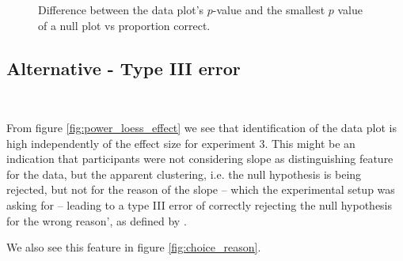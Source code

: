 \documentclass{article}
\newcommand{\blue}[1]{{\color{blue} #1}} %
\newcommand{\green}[1]{{\color{green} #1}} %
\newcommand{\hh}[1]{{\color{orange} #1}} %
\begin{document}
\begin{figure}[hbtp]
   \centering
       \caption{Difference between the data plot's $p$-value and the  smallest $p$ value of a null plot vs proportion correct.}
       \label{fig:pval_difference}
\end{figure}

\subsection{Alternative - Type III error}~\label{sec:TypeIII}

\hh{From figure \ref{fig:power_loess_effect} we see that identification of the data plot is high independently of the effect size for experiment 3. This might be an indication that participants were not considering slope as distinguishing feature for the data, but the apparent clustering, i.e. the null hypothesis is being rejected, but not for the reason of the slope -- which the experimental setup was asking for --  leading to a type III error of correctly rejecting the null hypothesis for the wrong reason', as defined by \citet{mosteller:48}.} 


\blue{We also see this feature in figure \ref{fig:choice_reason}}.
\end{document}
